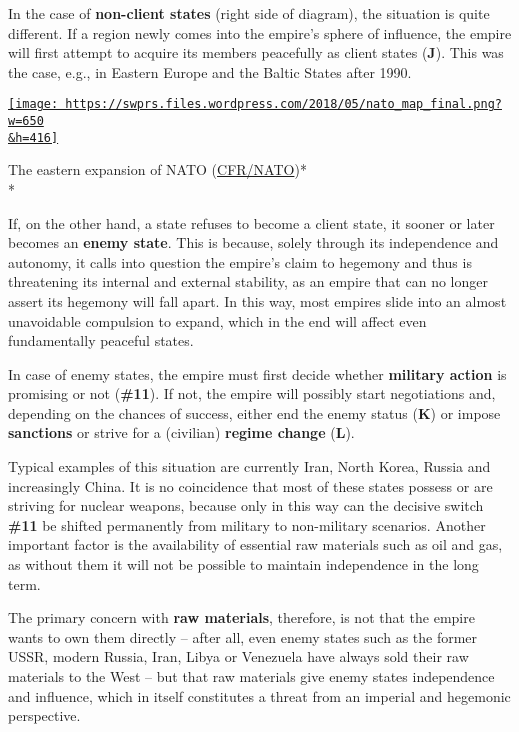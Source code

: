 In the case of \textbf{non-client states} (right side of diagram), the
situation is quite different. If a region newly comes into the empire's
sphere of influence, the empire will first attempt to acquire its
members peacefully as client states (\textbf{J}). This was the case,
e.g., in Eastern Europe and the Baltic States after 1990.

\href{https://swprs.files.wordpress.com/2018/05/nato_map_final.png}{\texttt{[image: https://swprs.files.wordpress.com/2018/05/nato\_map\_final.png?w=650\\\&h=416]}}

The eastern expansion of NATO
(\href{https://www.cfr.org/backgrounder/north-atlantic-treaty-organization-nato}{CFR/NATO})*\\
*

If, on the other hand, a state refuses to become a client state, it
sooner or later becomes an \textbf{enemy state}. This is because, solely
through its independence and autonomy, it calls into question the
empire's claim to hegemony and thus is threatening its internal and
external stability, as an empire that can no longer assert its hegemony
will fall apart. In this way, most empires slide into an almost
unavoidable compulsion to expand, which in the end will affect even
fundamentally peaceful states.

In case of enemy states, the empire must first decide whether
\textbf{military action} is promising or not (\textbf{\#11}). If not,
the empire will possibly start negotiations and, depending on the
chances of success, either end the enemy status (\textbf{K}) or impose
\textbf{sanctions} or strive for a (civilian) \textbf{regime change}
(\textbf{L}).

Typical examples of this situation are currently Iran, North Korea,
Russia and increasingly China. It is no coincidence that most of these
states possess or are striving for nuclear weapons, because only in this
way can the decisive switch \textbf{\#11} be shifted permanently from
military to non-military scenarios. Another important factor is the
availability of essential raw materials such as oil and gas, as without
them it will not be possible to maintain independence in the long term.

The primary concern with \textbf{raw materials}, therefore, is not that
the empire wants to own them directly -- after all, even enemy states
such as the former USSR, modern Russia, Iran, Libya or Venezuela have
always sold their raw materials to the West -- but that raw materials
give enemy states inde­pen­dence and influence, which in itself
constitutes a threat from an imperial and hegemonic perspective.

